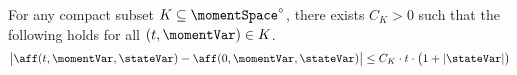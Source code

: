\begin{proposition}
  \label{proposition:aff-differentiable}
  For any compact subset $K \subseteq \momentSpace^\circ$, there exists $C_K > 0$ such that the following holds for all $(t, \momentVar) \in K$.
  \begin{equation}
    \big| \aff(t, \momentVar, \stateVar) - \aff(0, \momentVar, \stateVar) \big| \leq C_K \cdot t \cdot \big( 1 + |\stateVar| \big)
  \end{equation}
\end{proposition}
